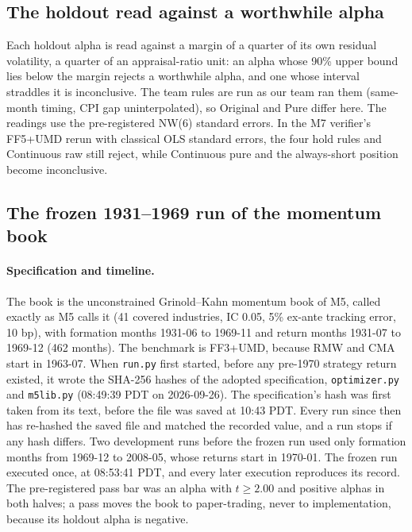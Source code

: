 \subsection{The holdout read against a worthwhile alpha}
Each holdout alpha is read against a margin of a quarter of its own residual volatility, a quarter of an appraisal-ratio unit: an alpha whose 90\% upper bound lies below the margin rejects a worthwhile alpha, and one whose interval straddles it is inconclusive. The team rules are run as our team ran them (same-month timing, CPI gap uninterpolated), so Original and Pure differ here. The readings use the pre-registered NW(6) standard errors. In the M7 verifier's FF5+UMD rerun with classical OLS standard errors, the four hold rules and Continuous raw still reject, while Continuous pure and the always-short position become inconclusive.

\begin{table}[H]
\caption{Holdout (2022-08 to 2026-07, 48 months) alphas read against the margin. Every attention rule rejects a worthwhile alpha under both factor models; the momentum books and the EPA spread are inconclusive, because 48 months cannot tell 0\% from 3\% for them.}
\label{tab:m7holdout}
\centering\footnotesize

\end{table}

\subsection{The frozen 1931--1969 run of the momentum book}
\label{app:m7frozen}
\paragraph{Specification and timeline.} The book is the unconstrained Grinold--Kahn momentum book of M5, called exactly as M5 calls it (41 covered industries, IC 0.05, 5\% ex-ante tracking error, 10 bp), with formation months 1931-06 to 1969-11 and return months 1931-07 to 1969-12 (462 months). The benchmark is FF3+UMD, because RMW and CMA start in 1963-07. When \texttt{run.py} first started, before any pre-1970 strategy return existed, it wrote the SHA-256 hashes of the adopted specification, \texttt{optimizer.py} and \texttt{m5lib.py} (08:49:39 PDT on 2026-09-26). The specification's hash was first taken from its text, before the file was saved at 10:43 PDT. Every run since then has re-hashed the saved file and matched the recorded value, and a run stops if any hash differs. Two development runs before the frozen run used only formation months from 1969-12 to 2008-05, whose returns start in 1970-01. The frozen run executed once, at 08:53:41 PDT, and every later execution reproduces its record. The pre-registered pass bar was an alpha with $t\ge2.00$ and positive alphas in both halves; a pass moves the book to paper-trading, never to implementation, because its holdout alpha is negative.

